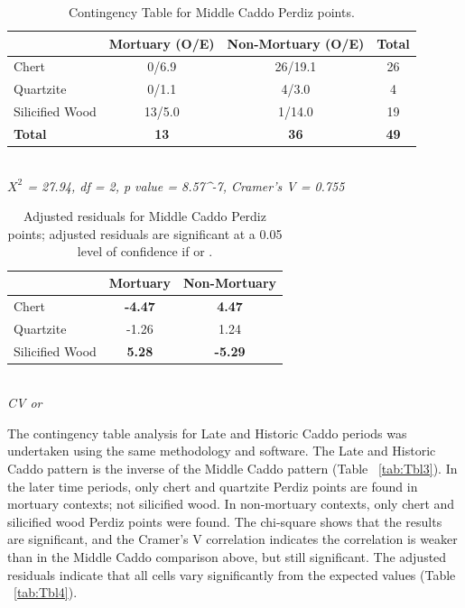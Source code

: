 \documentclass[review]{elsarticle}
\begin{document}
\begin{table}[tbh]\centering
\footnotesize
\caption{Contingency Table for Middle Caddo Perdiz points.}
\centering
\begin{tabular}{lccc}
\hline
 & Mortuary (O/E) & Non-Mortuary (O/E) & Total\\
\hline
Chert & 0/6.9 & 26/19.1 & 26\\
Quartzite & 0/1.1 & 4/3.0 & 4\\
Silicified Wood & 13/5.0 & 1/14.0 & 19\\
\hline
\textbf{Total} & \textbf{13} & \textbf{36} & \textbf{49}\\
\hline
\end{tabular}\\
\textit{$X^{2}$ = 27.94, df = 2, p value = 8.57^{-7}, Cramer’s V = 0.755}
\label{tab:Tbl1}
\end{table}

\begin{table}[tbh]\centering
\footnotesize
\caption{Adjusted residuals for Middle Caddo Perdiz points; adjusted residuals are significant at a 0.05 level of confidence if \textbf{} or \textbf{}.}
\centering
\begin{tabular}{lcc}
\hline
 & Mortuary & Non-Mortuary\\
\hline
Chert & \textbf{-4.47} & \textbf{4.47}\\
Quartzite & -1.26 & 1.24\\
Silicified Wood & \textbf{5.28} & \textbf{-5.29}\\
\hline
\end{tabular}\\
\textit{CV  or }
\label{tab:Tbl2}
\end{table}

The contingency table analysis for Late and Historic Caddo periods was undertaken using the same methodology and software. The Late and Historic Caddo pattern is the inverse of the Middle Caddo pattern (Table ~\ref{tab:Tbl3}). In the later time periods, only chert and quartzite Perdiz points are found in mortuary contexts; not silicified wood. In non-mortuary contexts, only chert and silicified wood Perdiz points were found. The chi-square shows that the results are significant, and the Cramer’s V correlation indicates the correlation is weaker than in the Middle Caddo comparison above, but still significant. The adjusted residuals indicate that all cells vary significantly from the expected values (Table ~\ref{tab:Tbl4}).
\end{document}
